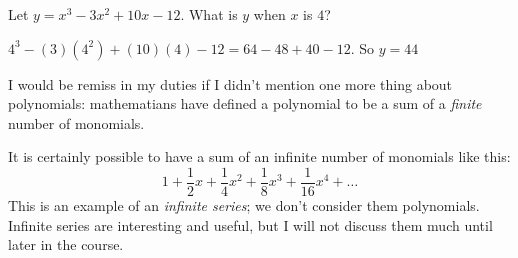 \begin{Exercise}[title={Evaluate a Polynomial}, label=evaluatepolynomial]
  Let $y = x^3 - 3x^2 + 10x - 12$. What is $y$ when $x$ is $4$?
\end{Exercise}
\begin{Answer}[ref=evaluatepolynomial]
  $4^3 - (3)(4^2) + (10)(4) - 12 = 64 - 48 + 40 - 12$. So $y = 44$ 
\end{Answer}

I would be remiss in my duties if I didn't mention one more thing
about polynomials: mathematians have defined a polynomial to be a sum
of a \emph{finite} number of monomials.

It is certainly possible to have a sum of an infinite number of monomials
like this:
\begin{equation*}
1 + \frac{1}{2}x + \frac{1}{4}x^2 + \frac{1}{8}x^3 + \frac{1}{16}x^4 + \ldots
\end{equation*}
This is an example of an \emph{infinite series}; we don't consider
them polynomials. Infinite series are interesting and useful, but I 
will not discuss them much until later in the course.
